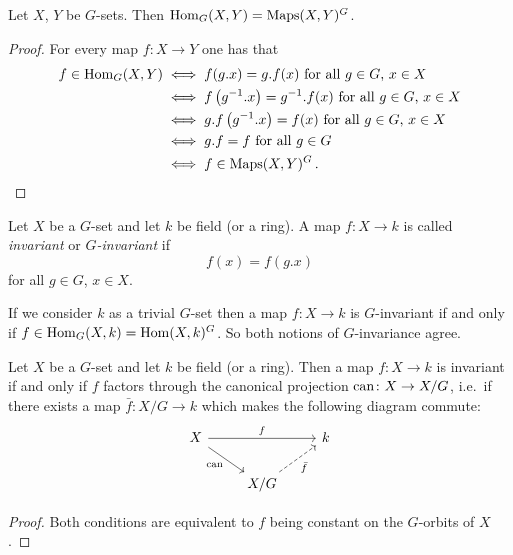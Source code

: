 \begin{lemma}
  Let $X$, $Y$ be $G$-sets.
  Then $\operatorname{Hom}_G(X,Y) = \operatorname{Maps}(X,Y)^G$.
\end{lemma}
\begin{proof}
  For every map $f \colon X \to Y$ one has that
  \begin{align*}
          f \in \operatorname{Hom}_G(X,Y)
    &\iff \text{$f(g.x) = g.f(x)$ for all $g \in G$, $x \in X$} \\
    &\iff \text{$f\left( g^{-1}.x \right) = g^{-1}.f(x)$ for all $g \in G$, $x \in X $} \\
    &\iff \text{$g.f\left( g^{-1}.x \right) = f(x)$ for all $g \in G$, $x \in X$} \\
    &\iff \text{$g.f = f$ for all $g \in G$}  \\
    &\iff f \in \operatorname{Maps}(X,Y)^G \,.
    \qedhere
  \end{align*}
\end{proof}


\begin{definition}
  Let $X$ be a $G$-set and let $k$ be field \textup(or a ring\textup).
  A map $f \colon X \to k$ is called \emph{invariant} or \emph{$G$-invariant} if
  \[
      f(x)
    = f\left( g.x \right)
  \]
  for all $g \in G$, $x \in X$.
\end{definition}


\begin{fluff}
  If we consider $k$ as a trivial $G$-set then a map $f \colon X \to k$ is $G$-invariant if and only if $f \in \operatorname{Hom}_G(X,k) = \operatorname{Hom}(X,k)^G$.
  So both notions of $G$-invariance agree.
\end{fluff}


\begin{lemma}
  Let $X$ be a $G$-set and let $k$ be field \textup(or a ring\textup).
  Then a map $f \colon X \to k$ is invariant if and only if $f$ factors through the canonical projection $\operatorname{can} \colon X \to X/G$, i.e.\ if there exists a map $\bar{f} \colon X/G \to k$ which makes the following diagram commute:
  \[
    \begin{tikzcd}
        X
        \arrow{rr}{f}
        \arrow[swap]{rd}{\can}
      & {}
      & k
      \\
        {}
      & X/G
        \arrow[swap, dashed]{ru}{\bar{f}}
      & {}
    \end{tikzcd}
  \]
\end{lemma}
\begin{proof}
  Both conditions are equivalent to $f$ being constant on the $G$-orbits of $X$.
\end{proof}


